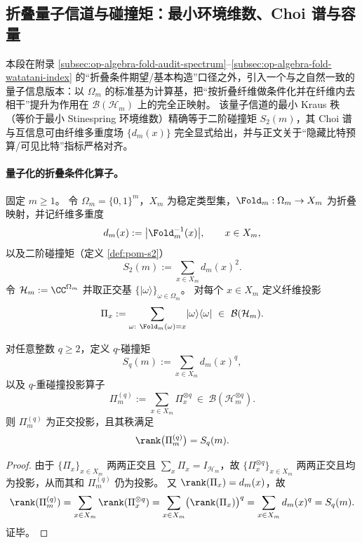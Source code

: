\subsection{折叠量子信道与碰撞矩：最小环境维数、Choi 谱与容量}\label{subsec:op-algebra-fold-quantum-channel}
本段在附录 \ref{subsec:op-algebra-fold-audit-spectrum}--\ref{subsec:op-algebra-fold-watatani-index} 的“折叠条件期望/基本构造”口径之外，引入一个与之自然一致的量子信息版本：以 \(\Omega_m\) 的标准基为计算基，把“按折叠纤维做条件化并在纤维内去相干”提升为作用在 \(\mathcal{B}(\mathcal{H}_m)\) 上的完全正映射。
该量子信道的最小 Kraus 秩（等价于最小 Stinespring 环境维数）精确等于二阶碰撞矩 \(S_2(m)\)，其 Choi 谱与互信息可由纤维多重度场 \(\{d_m(x)\}\) 完全显式给出，并与正文关于“隐藏比特预算/可见比特”指标严格对齐。

\providecommand{\ket}[1]{\lvert #1\rangle}
\providecommand{\bra}[1]{\langle #1\rvert}

\paragraph{量子化的折叠条件化算子。}
固定 \(m\ge 1\)。
令 \(\Omega_m=\{0,1\}^m\)，\(X_m\) 为稳定类型集，\(\Fold_m:\Omega_m\to X_m\) 为折叠映射，并记纤维多重度
\[
d_m(x):=\bigl|\Fold_m^{-1}(x)\bigr|,\qquad x\in X_m,
\]
以及二阶碰撞矩（定义 \ref{def:pom-s2}）
\[
S_2(m):=\sum_{x\in X_m} d_m(x)^2.
\]
令 \(\mathcal{H}_m:=\CC^{\Omega_m}\) 并取正交基 \(\{\lvert\omega\rangle\}_{\omega\in\Omega_m}\)。
对每个 \(x\in X_m\) 定义纤维投影
\[
\Pi_x:=\sum_{\omega:\ \Fold_m(\omega)=x}\lvert\omega\rangle\langle\omega\rvert\ \in\ \mathcal{B}(\mathcal{H}_m).
\]

\begin{proposition}\label{prop:op-algebra-fold-q-collision-projector-rank}
对任意整数 \(q\ge 2\)，定义 \(q\)-碰撞矩
\[
S_q(m):=\sum_{x\in X_m} d_m(x)^q,
\]
以及 \(q\)-重碰撞投影算子
\[
\Pi_m^{(q)}:=\sum_{x\in X_m}\Pi_x^{\otimes q}\ \in\ \mathcal{B}(\mathcal{H}_m^{\otimes q}).
\]
则 \(\Pi_m^{(q)}\) 为正交投影，且其秩满足
\[
\rank\bigl(\Pi_m^{(q)}\bigr)=S_q(m).
\]
\end{proposition}
\begin{proof}
由于 \(\{\Pi_x\}_{x\in X_m}\) 两两正交且 \(\sum_x\Pi_x=I_{\mathcal{H}_m}\)，故 \(\{\Pi_x^{\otimes q}\}_{x\in X_m}\) 两两正交且均为投影，从而其和 \(\Pi_m^{(q)}\) 仍为投影。
又 \(\rank(\Pi_x)=d_m(x)\)，故
\[
\rank(\Pi_m^{(q)})
=\sum_{x\in X_m}\rank(\Pi_x^{\otimes q})
=\sum_{x\in X_m}\bigl(\rank(\Pi_x)\bigr)^q
=\sum_{x\in X_m} d_m(x)^q
=S_q(m).
\]
证毕。
\end{proof}

